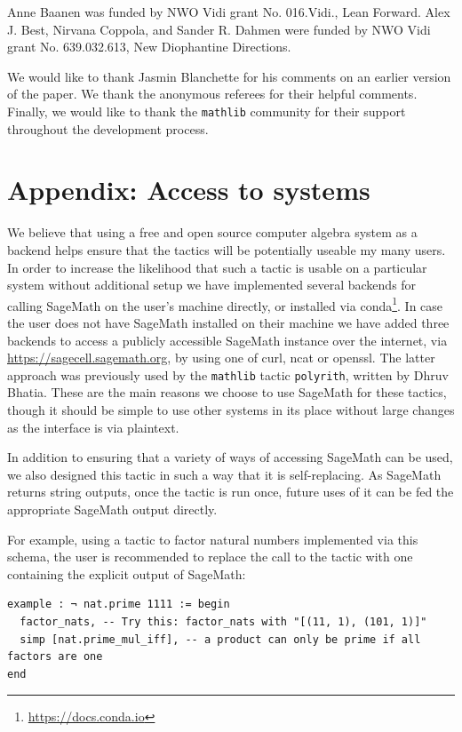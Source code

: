 \documentclass[sigplan,10pt,nonacm,
screen]{acmart} \settopmatter{printfolios=true,printccs=false,printacmref=false}
\newcommand{\mathlib}{\lstinline{mathlib}\xspace}
\begin{document}
\begin{acks}
Anne Baanen was funded by NWO Vidi grant No. 016.Vidi., Lean Forward.
Alex J. Best, Nirvana Coppola, and Sander R. Dahmen were funded by NWO Vidi grant No. 639.032.613, New Diophantine Directions.

We would like to thank Jasmin Blanchette for his comments on an earlier version of the paper.
We thank the anonymous referees for their helpful comments.
Finally, we would like to thank the \mathlib community for their support throughout the development process.
\end{acks}

\appendix

\section{Appendix: Access to systems}\label{app:access}

We believe that using a free and open source computer algebra system as a backend helps ensure that the tactics will be potentially useable my many users.
In order to increase the likelihood that such a tactic is usable on a particular system without additional setup we have implemented several backends for calling SageMath on the user's machine directly, or installed via conda\footnote{\url{https://docs.conda.io}}.
In case the user does not have SageMath installed on their machine we have added three backends to access a publicly accessible SageMath instance over the internet, via \url{https://sagecell.sagemath.org}, by using one of curl, ncat or openssl.
The latter approach was previously used by the \mathlib tactic \lstinline{polyrith}, written by Dhruv Bhatia.
These are the main reasons we choose to use SageMath for these tactics, though it should be simple  to use other systems in its place without large changes as the interface is via plaintext.

In addition to ensuring that a variety of ways of accessing SageMath can be used, we also designed this tactic in such a way that it is self-replacing.
As SageMath returns string outputs, once the tactic is run once, future uses of it can be fed the appropriate SageMath output directly.

For example, using a tactic to factor natural numbers implemented via this schema, the user is recommended to replace the call to the tactic with one containing the explicit output of SageMath:
\begin{lstlisting}
example : ¬ nat.prime 1111 := begin
  factor_nats, -- Try this: factor_nats with "[(11, 1), (101, 1)]"
  simp [nat.prime_mul_iff], -- a product can only be prime if all factors are one
end
\end{lstlisting}
\end{document}
